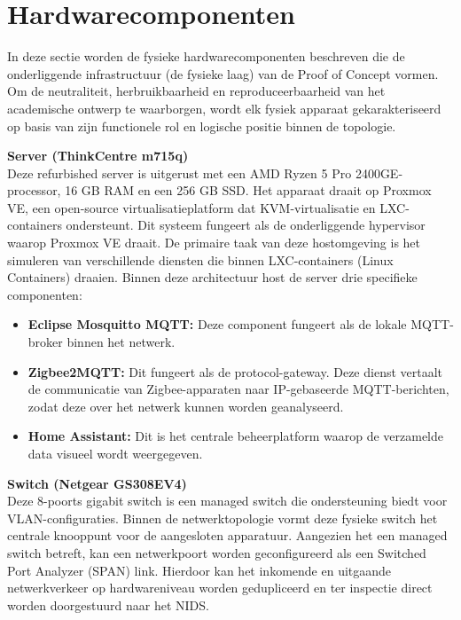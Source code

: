\section{Hardwarecomponenten}

In deze sectie worden de fysieke hardwarecomponenten beschreven die de onderliggende infrastructuur (de fysieke laag) van de Proof of Concept vormen. Om de neutraliteit, herbruikbaarheid en reproduceerbaarheid van het academische ontwerp te waarborgen, wordt elk fysiek apparaat gekarakteriseerd op basis van zijn functionele rol en logische positie binnen de topologie.
\vspace{1em}

\textbf{Server (ThinkCentre m715q)} \\
Deze refurbished server is uitgerust met een AMD Ryzen 5 Pro 2400GE-processor, 16 GB RAM en een 256 GB SSD. Het apparaat draait op Proxmox VE, een open-source virtualisatieplatform dat KVM-virtualisatie en LXC-containers ondersteunt.
Dit systeem fungeert als de onderliggende hypervisor waarop Proxmox VE draait. De primaire taak van deze hostomgeving is het simuleren van verschillende diensten die binnen LXC-containers (Linux Containers) draaien. Binnen deze architectuur host de server drie specifieke componenten:
\begin{itemize}
    \item \textbf{Eclipse Mosquitto MQTT:} Deze component fungeert als de lokale MQTT-broker binnen het netwerk.
    \item \textbf{Zigbee2MQTT:} Dit fungeert als de protocol-gateway. Deze dienst vertaalt de communicatie van Zigbee-apparaten naar IP-gebaseerde MQTT-berichten, zodat deze over het netwerk kunnen worden geanalyseerd.
    \item \textbf{Home Assistant:} Dit is het centrale beheerplatform waarop de verzamelde data visueel wordt weergegeven.
\end{itemize}
\vspace{1em}

\textbf{Switch (Netgear GS308EV4)} \\
Deze 8-poorts gigabit switch is een managed switch die ondersteuning biedt voor VLAN-configuraties. Binnen de netwerktopologie vormt deze fysieke switch het centrale knooppunt voor de aangesloten apparatuur. Aangezien het een managed switch betreft, kan een netwerkpoort worden geconfigureerd als een Switched Port Analyzer (SPAN) link. Hierdoor kan het inkomende en uitgaande netwerkverkeer op hardwareniveau worden gedupliceerd en ter inspectie direct worden doorgestuurd naar het NIDS.
\vspace{1em}


